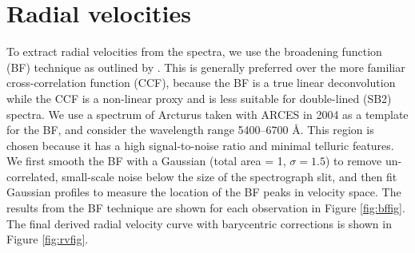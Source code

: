 \section{Radial velocities}\label{rvs}
To extract radial velocities from the spectra, we use the broadening function (BF) technique as outlined by \citet{ruc02}. This is generally preferred over the more familiar cross-correlation function (CCF), because the BF is a true linear deconvolution while the CCF is a non-linear proxy and is less suitable for double-lined (SB2) spectra. We use a spectrum of Arcturus taken with ARCES in 2004 as a template for the BF, and consider the wavelength range 5400--6700 \AA. This region is chosen because it has a high signal-to-noise ratio and minimal telluric features. We first smooth the BF with a Gaussian (total area = 1, $\sigma=1.5$) to remove un-correlated, small-scale noise below the size of the spectrograph slit, and then fit Gaussian profiles to measure the location of the BF peaks in velocity space. The results from the BF technique are shown for each observation in Figure \ref{fig:bffig}. The final derived radial velocity curve with barycentric corrections is shown in Figure \ref{fig:rvfig}.
